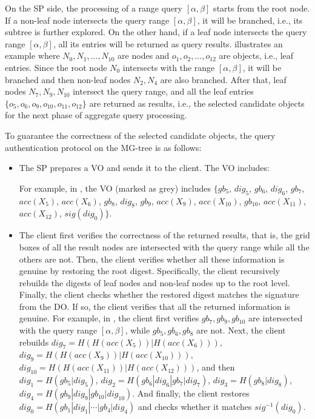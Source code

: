 On the SP side, the processing of a range query $[\alpha, \beta]$ starts from the root node. If a non-leaf node intersects the query range $[\alpha, \beta]$, it will be branched, i.e., its subtree is further explored. On the other hand, if a leaf node intersects the query range $[\alpha, \beta]$, all its entries will be returned as query results.  illustrates an example where $N_0, N_1, \dots, N_{10}$ are nodes and $o_1, o_2, \dots, o_{12}$ are objects, i.e., leaf entries. Since the root node $N_0$ intersects with the range $[\alpha, \beta]$, it will be branched and then non-leaf nodes $N_2, N_4$ are also branched. After that, leaf nodes $N_7, N_{9}, N_{10}$ intersect the query range, and all the leaf entries $\{o_5, o_6, o_{9}, o_{10}, o_{11}, o_{12}\}$ are returned as results, i.e., the selected candidate objects for the next phase of aggregate query processing.

To guarantee the correctness of the selected candidate objects, the query authentication protocol on the MG-tree is as follows:
\begin{itemize}
  \item The SP prepares a VO and sends it to the client. The VO includes:
    For example, in , the VO (marked as grey) includes $\{gb_5$, $dig_5$, $gb_6$, $dig_6$, $gb_7$, $acc(X_5)$, $acc(X_6)$, $gb_8$, $dig_8$, $gb_{9}$, $acc(X_9)$, $acc(X_{10})$, $gb_{10}$, $acc(X_{11})$, $acc(X_{12})$, $sig(dig_0)\}$.
  \item The client first verifies the correctness of the returned results, that is, the grid boxes of all the result nodes are intersected with the query range while all the others are not. Then, the client verifies whether all these information is genuine by restoring the root digest. Specifically, the client recursively rebuilds the digests of leaf nodes and non-leaf nodes up to the root level. Finally, the client checks whether the restored digest matches the signature from the DO\@. If so, the client verifies that all the returned information is genuine. For example, in , the client first verifies $gb_7, gb_9, gb_{10}$ are intersected with the query range $[\alpha, \beta]$, while $gb_5, gb_6, gb_8$ are not. Next, the client rebuilds $dig_{7} = H(H(acc(X_5)) | H(acc(X_6)))$, $dig_{9} = H(H(acc(X_9)) | H(acc(X_{10})))$, $dig_{10} = H(H(acc(X_{11})) | H(acc(X_{12})))$, and then $dig_1 = H(gb_5|dig_5)$, $dig_2 = H(gb_6|dig_6|gb_7|dig_7)$, $dig_3 = H(gb_8|dig_8)$, $dig_4 = H(gb_9|dig_9|gb_{10}|dig_{10})$. And finally, the client restores $dig_0 = H(gb_1|dig_1|\cdots|gb_4|dig_4)$ and checks whether it matches $sig^{-1}(dig_0)$.
\end{itemize}

